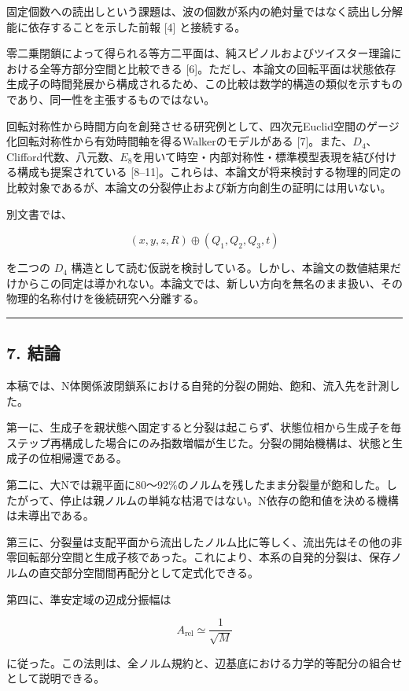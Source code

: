 \documentclass[
  a4paper,
]{ltjsarticle}
\begin{document}
固定個数への読出しという課題は、波の個数が系内の絶対量ではなく読出し分解能に依存することを示した前報
{[}4{]} と接続する。

零二乗閉鎖によって得られる等方二平面は、純スピノルおよびツイスター理論における全等方部分空間と比較できる
{[}6{]}。ただし、本論文の回転平面は状態依存生成子の時間発展から構成されるため、この比較は数学的構造の類似を示すものであり、同一性を主張するものではない。

回転対称性から時間方向を創発させる研究例として、四次元Euclid空間のゲージ化回転対称性から有効時間軸を得るWalkerのモデルがある
{[}7{]}。また、\(D_4\)、Clifford代数、八元数、\(E_8\)を用いて時空・内部対称性・標準模型表現を結び付ける構成も提案されている
{[}8--11{]}。これらは、本論文が将来検討する物理的同定の比較対象であるが、本論文の分裂停止および新方向創生の証明には用いない。

別文書では、

\[
(x,y,z,R)\oplus(Q_1,Q_2,Q_3,t)
\]

を二つの \(D_4\)
構造として読む仮説を検討している。しかし、本論文の数値結果だけからこの同定は導かれない。本論文では、新しい方向を無名のまま扱い、その物理的名称付けを後続研究へ分離する。

\begin{center}\rule{0.5\linewidth}{0.5pt}\end{center}

\subsection{7. 結論}\label{ux7d50ux8ad6-2}

本稿では、N体関係波閉鎖系における自発的分裂の開始、飽和、流入先を計測した。

第一に、生成子を親状態へ固定すると分裂は起こらず、状態位相から生成子を毎ステップ再構成した場合にのみ指数増幅が生じた。分裂の開始機構は、状態と生成子の位相帰還である。

第二に、大Nでは親平面に80〜92\%のノルムを残したまま分裂量が飽和した。したがって、停止は親ノルムの単純な枯渇ではない。N依存の飽和値を決める機構は未導出である。

第三に、分裂量は支配平面から流出したノルム比に等しく、流出先はその他の非零回転部分空間と生成子核であった。これにより、本系の自発的分裂は、保存ノルムの直交部分空間間再配分として定式化できる。

第四に、準安定域の辺成分振幅は

\[
A_{\mathrm{rel}}\simeq\frac1{\sqrt M}
\]

に従った。この法則は、全ノルム規約と、辺基底における力学的等配分の組合せとして説明できる。
\end{document}
